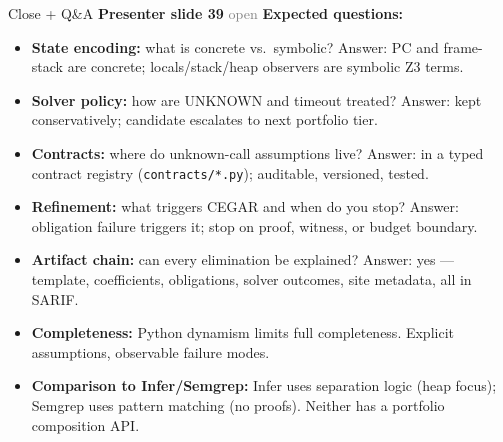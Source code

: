 \documentclass[aspectratio=169]{beamer}
\newcommand{\syncline}[2]{\textbf{#1} \hfill \textcolor{gray}{#2}}
\begin{document}
\begin{frame}{Close + Q\&A}
\syncline{Presenter slide 39}{open}
\textbf{Expected questions:}
\begin{itemize}
  \item \textbf{State encoding:} what is concrete vs.\ symbolic? Answer: PC and frame-stack are concrete; locals/stack/heap observers are symbolic Z3 terms.
  \item \textbf{Solver policy:} how are UNKNOWN and timeout treated? Answer: kept conservatively; candidate escalates to next portfolio tier.
  \item \textbf{Contracts:} where do unknown-call assumptions live? Answer: in a typed contract registry (\texttt{contracts/*.py}); auditable, versioned, tested.
  \item \textbf{Refinement:} what triggers CEGAR and when do you stop? Answer: obligation failure triggers it; stop on proof, witness, or budget boundary.
  \item \textbf{Artifact chain:} can every elimination be explained? Answer: yes --- template, coefficients, obligations, solver outcomes, site metadata, all in SARIF.
  \item \textbf{Completeness:} Python dynamism limits full completeness. Explicit assumptions, observable failure modes.
  \item \textbf{Comparison to Infer/Semgrep:} Infer uses separation logic (heap focus); Semgrep uses pattern matching (no proofs). Neither has a portfolio composition API.
\end{itemize}
\end{frame}
\end{document}
